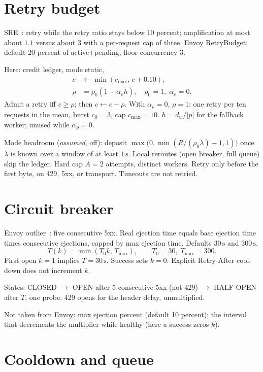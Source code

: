 \documentclass[journal,onecolumn]{IEEEtran}
\begin{document}
\section{Retry budget}

SRE~\cite{sre2016}: retry while the retry ratio stays below 10 percent;
amplification at most about $1.1$ versus about $3$ with a per-request cap
of three. Envoy RetryBudget: default 20 percent of active+pending, floor
concurrency $3$.

Here: credit ledger, mode static,
\begin{align}
c &\leftarrow \min(c_{\max},\,c+0.10),\\
\rho &= \rho_0(1-\alpha_{\rho}h),
\quad \rho_0=1,\;\alpha_{\rho}=0.
\end{align}
Admit a retry iff $c\ge\rho$; then $c\leftarrow c-\rho$. With
$\alpha_{\rho}=0$, $\rho=1$: one retry per ten requests in the mean, burst
$c_0=3$, cap $c_{\max}=10$. $h=d_w/|p|$ for the fallback worker; unused
while $\alpha_{\rho}=0$.

Mode headroom (\emph{assumed}, off): deposit
$\max\bigl(0,\min(R/(\rho_0\lambda)-1,1)\bigr)$ once $\lambda$ is known
over a window of at least $1\,\mathrm{s}$. Local reroutes (open breaker,
full queue) skip the ledger. Hard cap $A=2$ attempts, distinct workers.
Retry only before the first byte, on 429, 5xx, or transport. Timeouts are
not retried.

\section{Circuit breaker}

Envoy outlier~\cite{envoy-outlier}: five consecutive 5xx. Real ejection
time equals base ejection time times consecutive ejections, capped by max
ejection time. Defaults $30\,\mathrm{s}$ and $300\,\mathrm{s}$.
\[
T(k)=\min(T_0 k,\,T_{\max}),\qquad T_0=30,\; T_{\max}=300.
\]
First open $k=1$ implies $T=30\,\mathrm{s}$. Success sets $k=0$. Explicit
Retry-After cool-down does not increment $k$.

States: CLOSED $\to$ OPEN after 5 consecutive 5xx (not 429) $\to$
HALF-OPEN after $T$, one probe. 429 opens for the header delay,
unmultiplied.

Not taken from Envoy: max ejection percent (default 10 percent); the
interval that decrements the multiplier while healthy (here a success
zeros $k$).

\section{Cooldown and queue}
\end{document}
